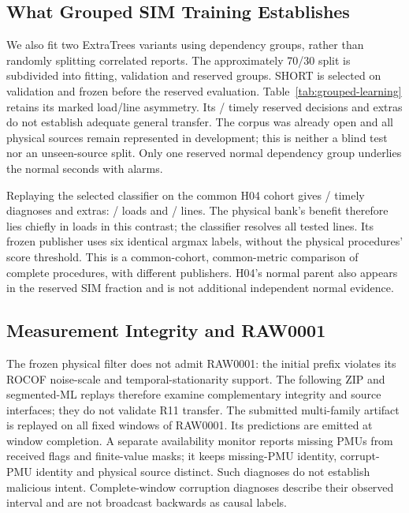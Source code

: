 \subsection{What Grouped SIM Training Establishes}
We also fit two ExtraTrees variants using dependency groups, rather than
randomly splitting correlated reports. The approximately 70/30 split is
subdivided into \MLTrainGroups{} fitting, \MLValGroups{} validation and
\MLHoldGroups{} reserved groups. SHORT is selected on validation and
frozen before the reserved evaluation. Table~\ref{tab:grouped-learning}
retains its marked load/line asymmetry. Its
\MLHoldTimely{}/\MLHoldEvents{} timely reserved decisions and
\MLHoldExtras{} extras do not establish adequate general transfer.
The corpus was already open and all physical sources remain represented
in development; this is neither a blind test nor an unseen-source split.
Only one reserved normal dependency group underlies the
\MLHoldNormalSeconds{} normal seconds with \MLHoldNormalAlarms{} alarms.


Replaying the selected classifier on the common H04 cohort gives
\ETCommonTimely{}/\ETCommonTotal{} timely diagnoses and \ETCommonExtras{}
extras: \ETCommonLoad{}/\ETCommonLoadTotal{} loads and
\ETCommonLine{}/\ETCommonLineTotal{} lines. The physical bank's benefit
therefore lies chiefly in loads in this contrast; the classifier resolves
all tested lines. Its frozen publisher uses six identical argmax labels,
without the physical procedures' score threshold. This is a common-cohort,
common-metric comparison of complete procedures, with different publishers.
H04's normal parent also appears in the reserved SIM fraction and is not
additional independent normal evidence.

\subsection{Measurement Integrity and RAW0001}
The frozen physical filter does not admit RAW0001: the initial prefix
violates its ROCOF noise-scale and temporal-stationarity support. The
following ZIP and segmented-ML replays therefore examine complementary
integrity and source interfaces; they do not validate R11 transfer.
The submitted multi-family artifact is replayed on all
\SSRawWindows{} fixed windows of RAW0001. Its predictions are emitted at
window completion. A separate availability monitor reports missing PMUs
from received flags and finite-value masks; it keeps missing-PMU identity,
corrupt-PMU identity and physical source distinct. Such diagnoses do not
establish malicious intent. Complete-window corruption diagnoses describe
their observed interval and are not broadcast backwards as causal labels.

